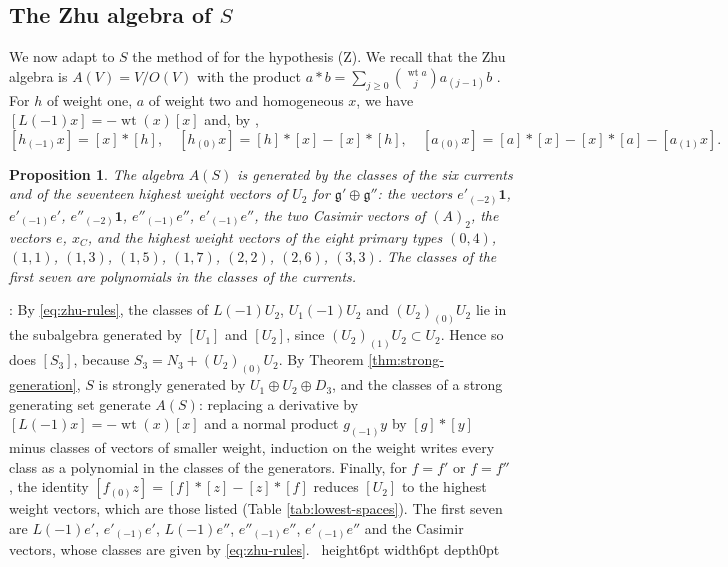\documentclass[leqno]{article}
\renewcommand{\geq}{\ensuremath{\geqslant}}
\newcommand{\qed}{\hfill \vrule height6pt  width6pt depth0pt}
\newtheorem{prop}[thm]{Proposition}
\newenvironment{proof}[1][]{\noindent {\it Proof #1} : }{\hbox{~}\qed
\smallskip
}
\numberwithin{equation}{section}
\begin{document}
\subsection{The Zhu algebra of \texorpdfstring{$S$}{S}}
\label{subsec:zhu}

We now adapt to $S$ the method of \cite[Part III]{Rie26b} for the hypothesis (Z). We recall that the Zhu algebra is $A(V) = V/O(V)$ with the product $a * b = \sum_{j \geq 0}\binom{\operatorname{wt}a}{j}a_{(j-1)}b$ \cite[Definition 2.1.2 and Theorem 2.1.1]{Zhu96}. For $h$ of weight one, $a$ of weight two and homogeneous $x$, we have $[L(-1)x] = -\operatorname{wt}(x)[x]$ \cite[Lemma 2.1.1]{Zhu96} and, by \cite[Lemma 2.1.3]{Zhu96},
\begin{equation}
\label{eq:zhu-rules}
[h_{(-1)}x] = [x]*[h], \quad [h_{(0)}x] = [h]*[x] - [x]*[h], \quad [a_{(0)}x] = [a]*[x] - [x]*[a] - [a_{(1)}x].
\end{equation}

\begin{prop}
\label{prop:zhu-generators}
The algebra $A(S)$ is generated by the classes of the six currents and of the seventeen highest weight vectors of $U_2$ for $\mathfrak g' \oplus \mathfrak g''$: the vectors $e'_{(-2)}\mathbf 1$, $e'_{(-1)}e'$, $e''_{(-2)}\mathbf 1$, $e''_{(-1)}e''$, $e'_{(-1)}e''$, the two Casimir vectors of $(A)_2$, the vectors $e$, $x_C$, and the highest weight vectors of the eight primary types $(0,4)$, $(1,1)$, $(1,3)$, $(1,5)$, $(1,7)$, $(2,2)$, $(2,6)$, $(3,3)$. The classes of the first seven are polynomials in the classes of the currents.
\end{prop}

\begin{proof}
By \eqref{eq:zhu-rules}, the classes of $L(-1)U_2$, $U_1(-1)U_2$ and $(U_2)_{(0)}U_2$ lie in the subalgebra generated by $[U_1]$ and $[U_2]$, since $(U_2)_{(1)}U_2 \subset U_2$. Hence so does $[S_3]$, because $S_3 = N_3 + (U_2)_{(0)}U_2$. By Theorem \ref{thm:strong-generation}, $S$ is strongly generated by $U_1 \oplus U_2 \oplus D_3$, and the classes of a strong generating set generate $A(S)$: replacing a derivative by $[L(-1)x] = -\operatorname{wt}(x)[x]$ and a normal product $g_{(-1)}y$ by $[g]*[y]$ minus classes of vectors of smaller weight, induction on the weight writes every class as a polynomial in the classes of the generators. Finally, for $f = f'$ or $f = f''$, the identity $[f_{(0)}z] = [f]*[z] - [z]*[f]$ reduces $[U_2]$ to the highest weight vectors, which are those listed (Table \ref{tab:lowest-spaces}). The first seven are $L(-1)e'$, $e'_{(-1)}e'$, $L(-1)e''$, $e''_{(-1)}e''$, $e'_{(-1)}e''$ and the Casimir vectors, whose classes are given by \eqref{eq:zhu-rules}.
\end{proof}
\end{document}

